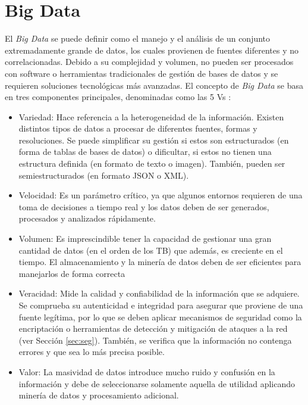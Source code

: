 \section{Big Data}
\label{sec:bigdata}


El \textit{Big Data} \cite{stab} se puede definir como el manejo y el análisis de un conjunto extremadamente grande de datos, los cuales provienen de fuentes diferentes y no correlacionadas. Debido a su complejidad y volumen, no pueden ser procesados con software o herramientas tradicionales de gestión de bases de datos y se requieren soluciones tecnológicas más avanzadas. El concepto de \textit{Big Data} se basa en tres componentes principales, denominadas como las 5 Vs \cite{5vs} \cite{5vs2}:

\begin{itemize}
    \item Variedad: Hace referencia a la heterogeneidad de la información. Existen distintos tipos de datos a procesar de diferentes fuentes, formas y resoluciones. Se puede simplificar su gestión si estos son estructurados (en forma de tablas de bases de datos) o dificultar, si estos no tienen una estructura definida (en formato de texto o imagen). También, pueden ser semiestructurados (en formato JSON o XML).
    \item Velocidad: Es un parámetro crítico, ya que algunos entornos requieren de una toma de decisiones a tiempo real y los datos deben de ser generados, procesados y analizados rápidamente. 
    \item Volumen: Es imprescindible tener la capacidad de gestionar una gran cantidad de datos (en el orden de los TB) que además, es creciente en el tiempo. El almacenamiento y la minería de datos deben de ser eficientes para manejarlos de forma correcta 
    \item Veracidad: Mide la calidad y confiabilidad de la información que se adquiere. Se comprueba su autenticidad e integridad para asegurar que proviene de una fuente legítima, por lo que se deben aplicar mecanismos de seguridad como la encriptación o herramientas de detección y mitigación de ataques a la red (ver Sección \ref{sec:seg}). También, se verifica que la información no contenga errores y que sea lo más precisa posible.
    \item Valor: La masividad de datos introduce mucho ruido y confusión en la información y debe de seleccionarse solamente aquella de utilidad aplicando minería de datos y procesamiento adicional.
\end{itemize}

